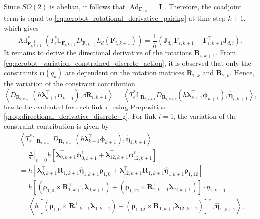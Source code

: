 Since \(SO(2)\) is abelian, it follows that \(\operatorname{Ad}_{\bm{F}_{i,k}}=\bm{I}\) \cite{Lee2008}.
Therefore, the coadjoint term is equal to \eqref{eq:acrobot_rotational_derivative_pairing} at time step $k+1$, which gives
\begin{equation}\label{eq:acrobot_Ad_variation}
\operatorname{Ad}^{*}_{\bm{F}_{i,k+1}^{-1}}
\!\left(
T_e^*\mathbb{L}_{\bm{F}_{i,k+1}}
D_{\bm{F}_{i,k+1}}L_d(\bm{F}_{i,k+1})
\right)
= 
\frac{1}{h}
\left(
\bm{J}_{d,i}\bm{F}_{i,k+1}
-
\bm{F}_{i,k+1}^{\top}\bm{J}_{d,i}
\right).
\end{equation}
It remains to derive the directional derivative of the rotations $\bm{R}_{i,k+1}$. 
From \eqref{eq:acrobot_variation_constrained_discrete_action}, it is observed that only the constraints $\bm{\phi}(q_k)$ are dependent on
the rotation matrices \(\bm{R}_{1,k}\) and \(\bm{R}_{2,k}\). 
Hence, the variation of the constraint contribution 
\begin{equation*}
    \left\langle D_{\bm{R}_{i,k+1}}(h \bm{\lambda}_{k+1}^\top \bm{\phi}_{k+1}), \delta \bm{R}_{i,k+1} \right\rangle=\left\langle T_e^* \mathbb{L}_{\bm{R}_{i,k+1}} D_{\bm{R}_{i,k+1}}(h \bm{\lambda}_{k+1}^\top \bm{\phi}_{k+1}), \bm{\widehat{\eta}}_{i,k+1} \right\rangle,
\end{equation*}
has to be evaluated for each link $i$, using Proposition \eqref{prop:directional_derivative_discrete_g}. For link $i=1$, the variation of the constraint contribution is given by
\begin{equation}
    \begin{aligned}
    &
    \left\langle
    T_e^*\mathbb{L}_{\bm{R}_{1,k+1}}
    D_{\bm{R}_{1,k+1}}
    \left(
    h\bm{\lambda}_{k+1}^{\top}\bm{\phi}_{k+1}
    \right),
    \bm{\widehat{\eta}}_{1,k+1}
    \right\rangle
    \\
    &=
    \left.
    \frac{d}{d\epsilon}
    \right|_{\epsilon=0}
    h
    \left[
    \bm{\lambda}_{0,k+1}^{\top}
    \bm{\phi}_{0,k+1}^{\epsilon}
    +
    \bm{\lambda}_{12,k+1}^{\top}
    \bm{\phi}_{12,k+1}^{\epsilon}
    \right]
    \\
    &=
    h 
    \left[
    \bm{\lambda}_{0,k+1}^{\top}
    \bm{R}_{1,k+1}\bm{\widehat{\eta}}_{1,k+1}\bm{\rho}_{1,0}
    +
    \bm{\lambda}_{12,k+1}^{\top}
    \bm{R}_{1,k+1}\bm{\widehat{\eta}}_{1,k+1}\bm{\rho}_{1,12}
    \right]
    \\
    &=
    h
    \left[
    \left(
    \bm{\rho}_{1,0}
    \times
    \bm{R}_{1,k+1}^{\top}\bm{\lambda}_{0,k+1}
    \right)
    +
    \left(
    \bm{\rho}_{1,12}
    \times
    \bm{R}_{1,k+1}^{\top}\bm{\lambda}_{12,k+1}
    \right)
    \right]
    \cdot
    \eta_{1,k+1}
    \\
    &=
    \left\langle
    h
    \left[
    \left(
    \bm{\rho}_{1,0}
    \times
    \bm{R}_{1,k+1}^{\top}\bm{\lambda}_{0,k+1}
    \right)
    +
    \left(
    \bm{\rho}_{1,12}
    \times
    \bm{R}_{1,k+1}^{\top}\bm{\lambda}_{12,k+1}
    \right)
    \right]^{\wedge},
    \bm{\widehat{\eta}}_{1,k+1}
    \right\rangle,
    \end{aligned}
    \label{eq:acrobot_R1_constraint_derivative_kp1}
\end{equation}
